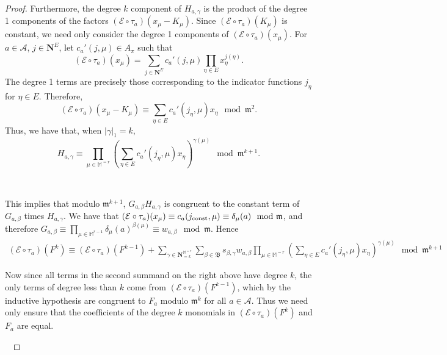 \documentclass[10pt]{amsart}
\theoremstyle{Theorem}
\theoremstyle{definition}
\newcommand{\NN}{\mathbf N}
\newcommand{\fm}{\mathfrak{m}}
\newcommand{\cA}{\mathcal{A}}
\newcommand{\cE}{\mathcal{E}}
\def\cs{s}
\begin{document}
\begin{proof}
Furthermore, the degree $k$ component of $H_{a,\gamma}$ is the product of the degree 1 components of the factors \newline $(\cE\circ \tau_a)(x_\mu - K_\mu)$.  Since $(\cE\circ \tau_a)(K_\mu)$ is constant, we need only consider the degree 1 components of  $(\cE\circ \tau_a)(x_\mu)$.  For $a\in\cA$, $j\in \NN^E$, let $c_a'(j,\mu)\in A_\pi$ such that
\[(\cE\circ \tau_a)(x_\mu) = \sum_{j\in \NN^E} c_a'(j,\mu) \prod_{\eta\in E}x_\eta^{j(\eta)}.\]
The degree 1 terms are precisely those corresponding to the indicator functions $j_\eta$ for $\eta\in E$.  Therefore, 
\[(\cE\circ \tau_a)(x_\mu - K_\mu)\equiv \sum_{\eta\in E}c_a'(j_\eta,\mu)x_\eta \mod \fm^2.\]
Thus, we have that, when $|\gamma|_1 = k$,
\[H_{a,\gamma} \equiv \prod_{\mu\in \mathbb{M}^{=r}}\left(\sum_{\eta\in E}c_a'(j_\eta,\mu)x_\eta\right)^{\gamma(\mu)} \mod \fm^{k+1}.\]

\ 

This implies that modulo $\fm^{k+1}$, $G_{a,\beta}H_{a,\gamma}$ is congruent to the constant term of $G_{a,\beta}$ times $H_{a,\gamma}$.  We have that $(\cE\circ \tau_a)(x_\mu) \equiv c_a(j_\textup{const},\mu) \equiv \delta_\mu(a) \mod \fm$, and therefore $G_{a,\beta}\equiv \prod_{\mu \in \mathbb{M}^{r-1}} \delta_\mu(a)^{\beta(\mu)}\equiv w_{a,\beta}\mod \fm$.  Hence
\begin{align*}
	(\cE\circ\tau_a)(F^k) \equiv (\cE\circ \tau_a)(F^{k-1}) + \sum_{\gamma\in \NN_{=k}^{\mathbb{M}^{=r}}}\sum_{\beta \in \mathfrak{B}} \cs_{\beta,\gamma}w_{a,\beta}\prod_{\mu\in \mathbb{M}^{=r}}\left(\sum_{\eta\in E}c_a'(j_\eta,\mu)x_\eta\right)^{\gamma(\mu)} \mod \fm^{k+1}
\end{align*}

Now since all terms in the second summand on the right above have degree $k$, the only terms of degree less than $k$ come from $(\cE\circ \tau_a)(F^{k-1})$, which by the inductive hypothesis are congruent to $F_a$ modulo $\fm^k$ for all $a\in \cA$.  Thus we need only ensure that the coefficients of the degree $k$ monomials in $(\cE\circ \tau_a)(F^k)$ and $F_a$ are equal.

\ 


\end{proof}
\end{document}
